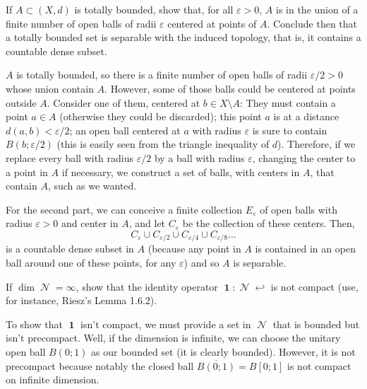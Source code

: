 \documentclass{article}
\theoremstyle{exercisestyle}
\newenvironment{exercise}[1]
  {\renewcommand\theinnerex{#1}\innerex}
  {\endinnerex}
\DeclareMathOperator{\normed}{\mathcal{N}}
\DeclareMathOperator{\Id}{\textbf{1}}
\newcommand{\closure}[1]{\overline{ #1}}
\newcommand{\openball}[2]{B\left(#1;#2\right)}
\newcommand{\closedball}[2]{B\left[#1;#2\right]}
\begin{document}
\begin{exercise}{1.3.2}
    If $A \subset (X, d)$ is totally bounded, show that, for all $\varepsilon > 0$, $A$ is in the union of a finite number of open balls of radii $\varepsilon$ centered at points of $A$.
    Conclude then that a totally bounded set is separable with the induced topology, that is, it contains a countable dense subset.

    $A$ is totally bounded, so there is a finite number of open balls of radii $\varepsilon/2 > 0$ whose union contain $A$.
    However, some of those balls could be centered at points outside $A$.
    Consider one of them, centered at $b \in X\setminus A$: They must contain a point $a \in A$ (otherwise they could be discarded);
    this point $a$ is at a distance $d(a,b)<\varepsilon/2$;
    an open ball centered at $a$ with radius $\varepsilon$ is sure to contain $\openball{b}{\varepsilon/2}$ (this is easily seen from the triangle inequality of $d$).
    Therefore, if we replace every ball with radius $\varepsilon/2$ by a ball with radius $\varepsilon$, changing the center to a point in $A$ if necessary,
    we construct a set of balls, with centers in $A$, that contain $A$, such as we wanted.

    For the second part, we can conceive a finite collection $E_\varepsilon$ of open balls with radius $\varepsilon > 0$ and center in $A$,
    and let $C_\varepsilon$ be the collection of these centers. Then,
    $$ C_\varepsilon \cup C_{\varepsilon/2} \cup C_{\varepsilon/4} \cup C_{\varepsilon/8} \dots$$
    is a countable dense subset in $A$ (because any point in $A$ is contained in an open ball around one of these points, for any $\varepsilon$) and so $A$ is separable.


\end{exercise}

\begin{exercise}{1.3.6}
    If $\dim \normed = \infty$, show that the identity operator $\Id : \normed \hookleftarrow$ is not compact (use, for instance, Riesz’s Lemma 1.6.2).

    To show that $\Id$ isn't compact, we must provide a set in $\normed$ that is bounded but isn't precompact. Well, if the dimension is infinite, we can choose
    the unitary open ball $\openball{0}{1}$ as our bounded set (it is clearly bounded). However, it is not precompact because notably the closed ball
    $ \closure{\openball{0}{1}} = \closedball{0}{1}$ is not compact on infinite dimension.

\end{exercise}
\end{document}
